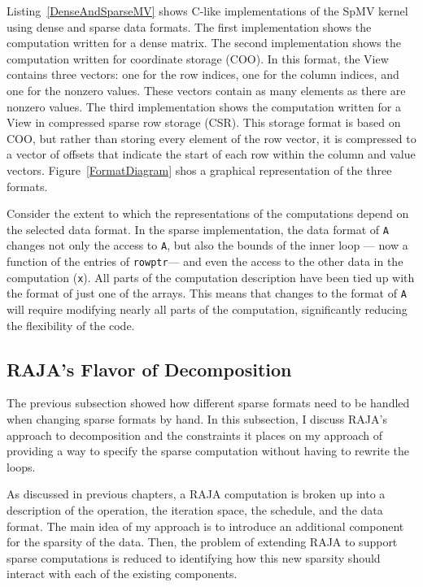 Listing~\ref{DenseAndSparseMV} shows C-like implementations of the SpMV kernel using dense and sparse data formats.
The first implementation shows the computation written for a dense matrix.
The second implementation shows the computation written for coordinate storage (COO). 
In this format, the View contains three vectors: one for the row indices, one for the column indices, and one for the nonzero values.
These vectors contain as many elements as there are nonzero values.
The third implementation shows the computation written for a View in compressed sparse row storage (CSR).
This storage format is based on COO, but rather than storing every element of the row vector, it is compressed to a vector of offsets that indicate the start of each row within the column and value vectors.
Figure~\ref{FormatDiagram} shos a graphical representation of the three formats.



Consider the extent to which the representations of the computations depend on the selected data format.
In the sparse implementation, the data format of \verb.A. changes not only the access to \verb.A., but also the bounds of the inner loop --- now a function of the entries of \verb.rowptr.--- and even the access to the other data in the computation (\verb.x.).
All parts of the computation description have been tied up with the format of just one of the arrays.
This means that changes to the format of \verb.A. will require modifying nearly all parts of the computation, significantly reducing the flexibility of the code.


\subsection{RAJA's Flavor of Decomposition}
The previous subsection showed how different sparse formats need to be handled when changing sparse formats by hand.  
In this subsection, I discuss RAJA's approach to decomposition and the constraints it places on my approach of providing a way to specify the sparse computation without having to rewrite the loops.

As discussed in previous chapters, a RAJA computation is broken up into a description of the operation, the iteration space, the schedule, and the data format.
The main idea of my approach is to introduce an additional component for the sparsity of the data.
Then, the problem of extending RAJA to support sparse computations is reduced to identifying how this new sparsity should interact with each of the existing components.

